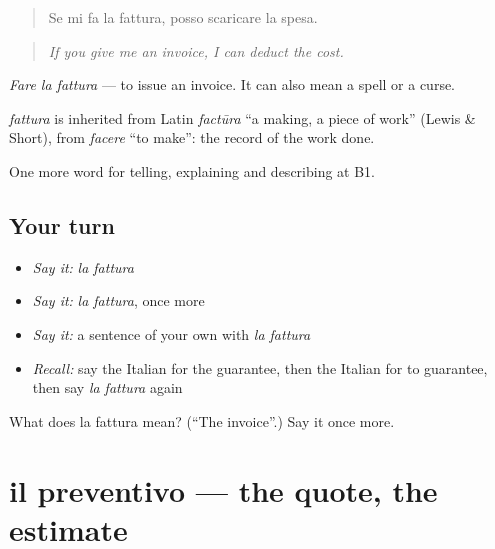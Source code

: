 \begin{quote}
Se mi fa la fattura, posso scaricare la spesa.
\end{quote}

\begin{quote}
\emph{If you give me an invoice, I can deduct the cost.}
\end{quote}

\emph{Fare la fattura} — to issue an invoice. It can also mean a spell or a curse.

\begin{cousinweb}
\emph{fattura} is inherited from Latin \emph{factūra} \textquotedblleft{}a making, a piece of work\textquotedblright{} (Lewis \& Short), from \emph{facere} \textquotedblleft{}to make\textquotedblright{}: the record of the work done.
\end{cousinweb}

\begin{grammarlens}[title={What you've built}]
One more word for telling, explaining and describing at B1.
\end{grammarlens}

\subsection*{Your turn}
\begin{itemize}
\raggedright
  \item \emph{Say it:} \emph{la fattura}
  \item \emph{Say it:} \emph{la fattura}, once more
  \item \emph{Say it:} a sentence of your own with \emph{la fattura}
  \item \emph{Recall:} say the Italian for the guarantee, then the Italian for to guarantee, then say \emph{la fattura} again
\end{itemize}

\begin{tcolorbox}[breakable,colback=teal!4,colframe=teal!35!black,title={Before you move on}]
What does la fattura mean? (\textquotedblleft{}The invoice\textquotedblright{}.) Say it once more.
\end{tcolorbox}
\section[il preventivo]{il preventivo — the quote, the estimate}

\label{lesson:IT-C397-preventivo}



